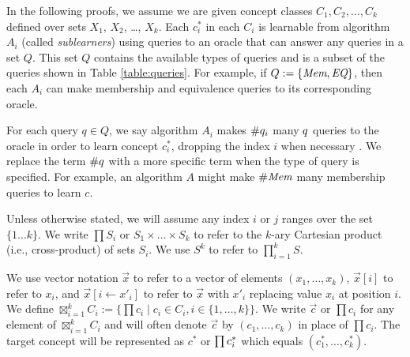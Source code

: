 In the following proofs, we assume we are given concept classes $C_1, C_2, \dots, C_k$ defined over sets $X_1$, $X_2$, \dots, $X_k$. 
Each $c^*_i$ in each $C_i$ is learnable from algorithm $A_i$ (called \emph{sublearners}) using queries to an oracle that can answer any queries in a set $Q$. 
This set $Q$ contains the available types of queries and is a subset of the queries shown in Table \ref{table:queries}.
For example, if $Q := \{ \emph{Mem}, \emph{EQ} \}$, then each $A_i$ can make membership and equivalence queries to its corresponding oracle. 


For each query $q \in Q$, we say algorithm $A_i$ makes $\#q_{i}$ many $q$ queries to the oracle in order to learn concept $c^*_i$, dropping the index $i$ when necessary .
We replace the term $\#q$ with a more specific term when the type of query is specified.
For example, an algorithm $A$ might make $\#\emph{Mem}$ many membership queries to learn $c$. 


Unless otherwise stated, we will assume any index $i$ or $j$ ranges over the set $\{ 1 \dots k \}$.
We write $\prod S_i$ or $S_1 \times \dots \times S_k$ to refer to the $k$-ary Cartesian product (i.e., cross-product) of sets $S_i$. 
We use $S^k$ to refer to $\prod_{i=1}^k S$. 

We use vector notation $\vec{x}$ to refer to a vector of elements $(x_1,\dots, x_k)$, $\vec{x}[i]$ to refer to $x_i$, and $\vec{x}[i \leftarrow x'_i]$ to refer to $\vec{x}$ with $x'_i$ replacing value $x_i$ at position $i$. 
We define $\boxtimes^k_{i=1} C_i := \{ \prod c_i \mid c_i \in C_i, i \in \{1,\dots,k\} \}$. 
We write $\vec{c}$ or $\prod c_i$ for any element of $\boxtimes^k_{i=1} C_i $ and will often denote $\vec{c}$ by $(c_1, \dots, c_k)$ in place of $\prod c_i$. 
The target concept will be represented as $c^*$ or $\prod c^*_i$ which equals $(c^*_1, \dots, c^*_k)$.



